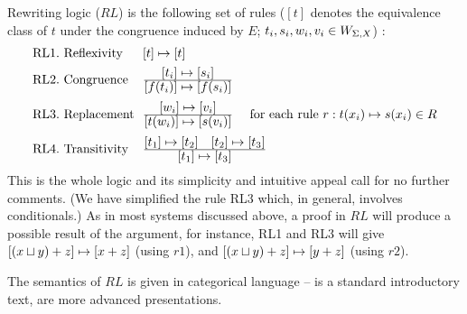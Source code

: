 {
Rewriting logic ($RL$) is the following set of rules ($[t]$ denotes 
the equivalence class of $t$ under the 
congruence induced by $E$; $t_{i}, s_{i}, w_{i}, v_{i}\in W_{{\Sigma,X}}$) :
\[ \begin{array}{l@{\ \ }l}
{\rm RL1.\  Reflexivity} & [t] \rew [t] \\[1ex]
{\rm RL2.\ Congruence} & \prule{[t_{i}]\rew [s_{i}]}{[f(t_{i})] \rew 
[f(s_{i})]} \\[2.5ex]
{\rm RL3.\ Replacement} & \prule{[w_{i}]\rew [v_{i}]}{[t(w_{i})] \rew 
[s(v_{i})]}\ \ \ \  {\rm for\ each\ rule\ } r: t(x_{i}) \rew 
s(x_{i}) \in R \\[2.5ex]
{\rm RL4.\ Transitivity} & \prule{[t_{1}]\rew [t_{2}]\ \ \ 
[t_{2}]\rew [t_{3}]}{[t_{1}]\rew [t_{3}]}
\end{array}
\] This is the whole logic and its simplicity and intuitive appeal call for 
no further comments.  (We have simplified the rule RL3 which, in general, 
involves conditionals.)  As in most systems discussed above, a proof in 
$RL$ will produce a possible result of the argument, for instance, RL1 and 
RL3 will give $[(x\sqcup y)+z]\mathrel{\mapsto} [x+z]$ (using $r1$), and $[(x\sqcup y)+z]\mathrel{\mapsto} 
[y+z]$ (using $r2$).

The semantics of $RL$ is given in categorical language -- \cite{c:Bar} is a standard 
introductory text, \cite{c:Bor, c:Mac} are more advanced presentations.

}
